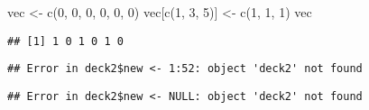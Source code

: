 \documentclass[
]{article}
\newenvironment{Shaded}{\begin{snugshade}}{\end{snugshade}}
\newcommand{\ConstantTok}[1]{\textcolor[rgb]{0.00,0.00,0.00}{#1}}
\newcommand{\DecValTok}[1]{\textcolor[rgb]{0.00,0.00,0.81}{#1}}
\newcommand{\FunctionTok}[1]{\textcolor[rgb]{0.00,0.00,0.00}{#1}}
\newcommand{\NormalTok}[1]{#1}
\newcommand{\OtherTok}[1]{\textcolor[rgb]{0.56,0.35,0.01}{#1}}
\newcommand{\SpecialCharTok}[1]{\textcolor[rgb]{0.00,0.00,0.00}{#1}}
\begin{document}
\begin{Shaded}
\begin{Highlighting}[]
\NormalTok{vec }\OtherTok{\textless{}{-}} \FunctionTok{c}\NormalTok{(}\DecValTok{0}\NormalTok{, }\DecValTok{0}\NormalTok{, }\DecValTok{0}\NormalTok{, }\DecValTok{0}\NormalTok{, }\DecValTok{0}\NormalTok{, }\DecValTok{0}\NormalTok{)}
\NormalTok{vec[}\FunctionTok{c}\NormalTok{(}\DecValTok{1}\NormalTok{, }\DecValTok{3}\NormalTok{, }\DecValTok{5}\NormalTok{)] }\OtherTok{\textless{}{-}} \FunctionTok{c}\NormalTok{(}\DecValTok{1}\NormalTok{, }\DecValTok{1}\NormalTok{, }\DecValTok{1}\NormalTok{)}
\NormalTok{vec}
\end{Highlighting}
\end{Shaded}

\begin{verbatim}
## [1] 1 0 1 0 1 0
\end{verbatim}

\begin{Shaded}
\end{Shaded}

\begin{verbatim}
## Error in deck2$new <- 1:52: object 'deck2' not found
\end{verbatim}

\begin{Shaded}
\end{Shaded}

\begin{verbatim}
## Error in deck2$new <- NULL: object 'deck2' not found
\end{verbatim}
\end{document}
